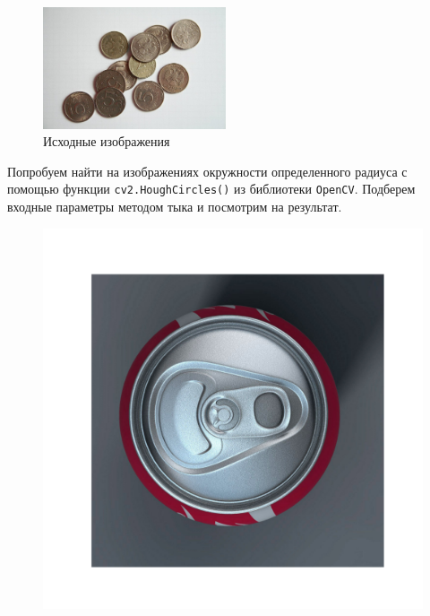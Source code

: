 \documentclass[a4paper,12pt]{article}
\begin{document}
\begin{figure}[H]
\begin{minipage}{0.48\textwidth}
    \end{minipage}
    \includegraphics[width=0.48\textwidth]{images/money.png}
    \caption{Исходные изображения}
\end{figure}
Попробуем найти на изображениях окружности определенного радиуса с помощью функции \texttt{cv2.HoughCircles()} из библиотеки \texttt{OpenCV}. Подберем входные параметры методом тыка и посмотрим на результат.
\begin{figure}[H]
    \centering
    \begin{minipage}{0.48\textwidth}
        \centering
        \includegraphics[width=\textwidth]{images/hough_circles/1_orig_fixed.png}
    \end{minipage}
    \begin{minipage}{0.48\textwidth}
        \centering

\end{minipage}
\end{figure}
\end{document}
